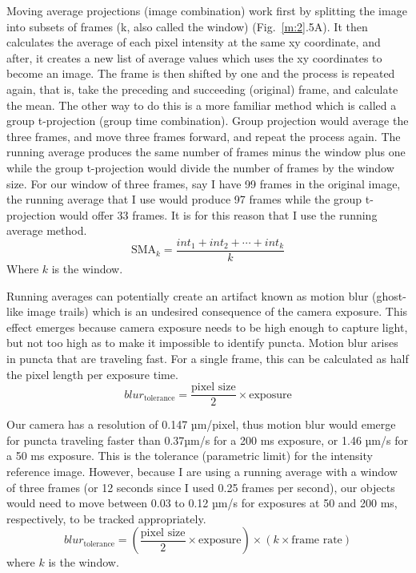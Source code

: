 Moving average projections (image combination) work first by splitting the image into subsets of frames (k, also called the window) (Fig.~\ref{m:2}.5A). It then calculates the average of each pixel intensity at the same xy coordinate, and after, it creates a new list of average values which uses the xy coordinates to become an image. The frame is then shifted by one and the process is repeated again, that is, take the preceding and succeeding (original) frame, and calculate the mean. The other way to do this is a more familiar method which is called a group t-projection (group time combination). Group projection would average the three frames, and move three frames forward, and repeat the process again. The running average produces the same number of frames minus the window plus one while the group t-projection would divide the number of frames by the window size. For our window of three frames, say I have 99 frames in the original image, the running average that I use would produce 97 frames while the group t-projection would offer 33 frames. It is for this reason that I use the running average method.
\begin{equation*}
\text{SMA}_k = \frac{int_1 + int_2 + \cdots + int_k}{k}
\end{equation*}
Where $k$ is the window.

Running averages can potentially create an artifact known as motion blur (ghost-like image trails) which is an undesired consequence of the camera exposure. This effect emerges because camera exposure needs to be high enough to capture light, but not too high as to make it impossible to identify puncta. Motion blur arises in puncta that are traveling fast. For a single frame, this can be calculated as half the pixel length per exposure time.
\begin{equation*}
blur_{\text{tolerance}} = \frac{\text{pixel size}}{2}\times \text{exposure}
\end{equation*}

Our camera has a resolution of 0.147 µm/pixel, thus motion blur would emerge for puncta traveling faster than 0.37µm/s for a 200 ms exposure, or 1.46 µm/s for a 50 ms exposure. This is the tolerance (parametric limit) for the intensity reference image. However, because I are using a running average with a window of three frames (or 12 seconds since I used 0.25 frames per second), our objects would need to move between 0.03 to 0.12 µm/s for exposures at 50 and 200 ms, respectively, to be tracked appropriately.
\begin{equation*}
blur_{\text{tolerance}} = (\frac{\text{pixel size}}{2}\times \text{exposure}) \times (k \times \text{frame rate})
\end{equation*}
where $k$ is the window.


